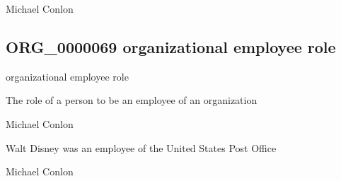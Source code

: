 \documentclass[letterpaper,10pt,english]{sphinxmanual}
\begin{document}
\begin{sphinxShadowBox}

\sphinxAtStartPar
Michael Conlon 
\end{sphinxShadowBox}
\begin{quote}

\ignorespaces \end{quote}


\subsection{ORG\_0000069 \sphinxhyphen{} organizational employee role}
\label{\detokenize{doc-ORG_0000069:org-0000069-organizational-employee-role}}\label{\detokenize{doc-ORG_0000069:index-0}}\label{\detokenize{doc-ORG_0000069::doc}}
\begin{sphinxShadowBox}

\sphinxAtStartPar
organizational employee role
\end{sphinxShadowBox}

\begin{sphinxShadowBox}

\sphinxAtStartPar
The role of a person to be an employee of an organization
\end{sphinxShadowBox}

\begin{sphinxShadowBox}

\sphinxAtStartPar
Michael Conlon 
\end{sphinxShadowBox}

\begin{sphinxShadowBox}

\sphinxAtStartPar
Walt Disney was an employee of the United States Post Office
\end{sphinxShadowBox}

\begin{sphinxShadowBox}

\sphinxAtStartPar
Michael Conlon 
\end{sphinxShadowBox}
\begin{quote}

\ignorespaces \end{quote}
\end{document}

